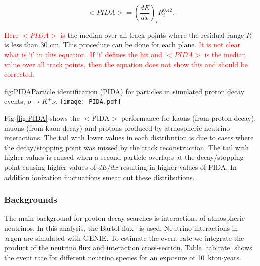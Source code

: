 \begin{equation}
<PIDA >= \left(\frac{dE}{dx}\right)_{i}R^{0.42}_{i}. 
\end{equation}

\textcolor{red}{Here $<PIDA>$ is} the median over all track points where the residual range $R$ is less than 30 cm. This procedure can be done for each plane. 
\textcolor{red}{It is not clear what is `i' in this equation. If `i' defines the hit and $<PIDA>$ is the median value over all track points, then the equation does not show this and should be corrected.}

\begin{dunefigure}{fig:PIDA}{Particle identification (PIDA) for particles in simulated proton decay events, $p\rightarrow K^{+} \bar{\nu}$.}
\texttt{[image: PIDA.pdf]}
\end{dunefigure}

Fig \ref{fig:PIDA} shows the $<$PIDA$>$ performance for kaons (from proton decay), muons (from kaon decay) and protons produced by atmospheric neutrino interactions. The tail with lower values in each distribution is due to cases where the decay/stopping point was missed by the track reconstruction. The tail with higher values is caused when a second particle overlaps at the decay/stopping point causing higher values of $dE/dx$ resulting in higher values of PIDA. In addition ionization fluctuations smear out these distributions.

\subsubsection{Backgrounds}
\label{sec:ndkbkgd}

The main background for proton decay searches is interactions of  atmospheric neutrinos. In this analysis, the Bartol flux~\cite{Barr:2004br} is used.
Neutrino interactions in argon are simulated with GENIE. To estimate the event rate we integrate the product of the neutrino flux and interaction cross-section.
Table \ref{tab:rate} shows the event rate for different neutrino species for an exposure of 10~kton$\cdot$years.

